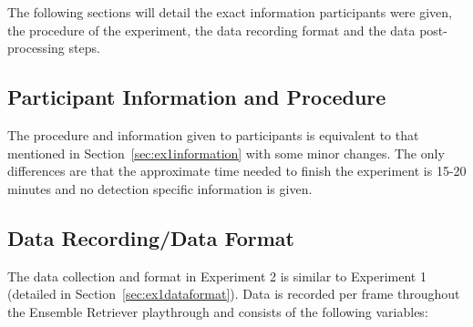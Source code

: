 The following sections will detail the exact information participants were given, the procedure of the experiment, the data recording format and the data post-processing steps.

\subsection{Participant Information and Procedure}\label{sec:ex2information}
The procedure and information given to participants is equivalent to that mentioned in Section~\ref{sec:ex1information} with some minor changes. The only differences are that the approximate time needed to finish the experiment is 15-20 minutes and no detection specific information is given. 

\subsection{Data Recording/Data Format}\label{sec:ex2dataformat}
The data collection and format in Experiment 2 is similar to Experiment 1 (detailed in Section~\ref{sec:ex1dataformat}). Data is recorded per frame throughout the Ensemble Retriever playthrough and consists of the following variables:

